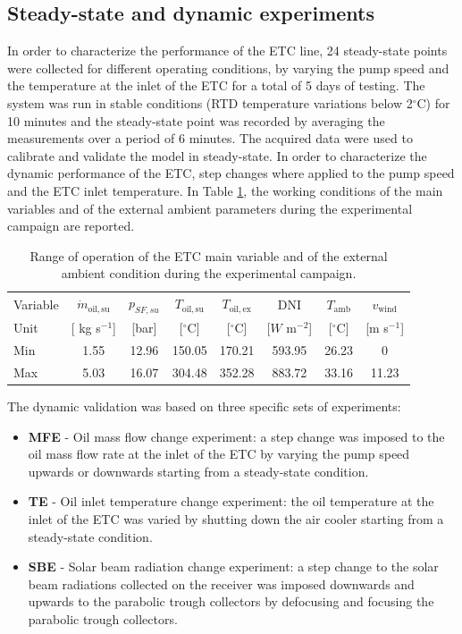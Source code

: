 \documentclass[final,3p,times,review]{elsarticle}
\begin{document}
\subsection{Steady-state and dynamic experiments}
%
In order to characterize the performance of the ETC line, 24 steady-state points were collected for different operating conditions, by varying the pump speed and the temperature at the inlet of the ETC for a total of 5 days of testing. The system was run in stable conditions (RTD temperature variations
below 2$^{\circ}$C) for 10 minutes and the steady-state point was recorded by averaging the measurements over a period of 6 minutes. The acquired data were used to calibrate and validate the model in steady-state.
In order to characterize the dynamic performance of the ETC, step changes where applied to the pump speed and the ETC inlet temperature. In Table \ref{Tab:SF_workCond}, the working conditions of the main variables and of the external ambient parameters during the experimental campaign are reported. 
%
\begin{table}[h!]
\centering
\caption{Range of operation of the ETC main variable and of the external ambient condition during the experimental campaign.}
\begin{tabular}{lccccccc}
\toprule
 Variable & $\dot{m}_\mathrm{oil,su}$ & $p_{SF,su}$  &$T_\mathrm{oil,su}$  & $T_\mathrm{oil,ex}$ &  DNI &  $T_\mathrm{amb}$ & $v_\mathrm{wind}$ \\
Unit &  [ kg s$^{-1}$] & [bar] & [$^{\circ}$C] &  [$^{\circ}$C]&  [$W$ m$^{-2}$] &  [$^{\circ}$C] &  [m s$^{-1}$] \\
\toprule
Min & 1.55      &   12.96 & 150.05  &   170.21  &   593.95  &   26.23 &   0  \\
Max & 5.03      &   16.07 & 304.48  &   352.28  &   883.72  &   33.16 &   11.23  \\
\bottomrule
\end{tabular}
\label{Tab:SF_workCond}
\end{table}
%
The dynamic validation was based on three specific sets of experiments:
%
\begin{itemize}
\item \textbf{MFE} - Oil mass flow change experiment: a step change was imposed to the oil mass flow rate at the inlet of the ETC by varying the pump speed upwards or downwards starting from a steady-state condition.
\item \textbf{TE} - Oil inlet temperature change experiment: the oil temperature at the inlet of the ETC was varied by shutting down the air cooler starting from a steady-state condition. 
\item \textbf{SBE} - Solar beam radiation change experiment: a step change to the solar beam radiations  collected on the receiver was imposed downwards and upwards to the parabolic trough collectors by defocusing and focusing the parabolic trough collectors.
\end{itemize} 
%
\end{document}
